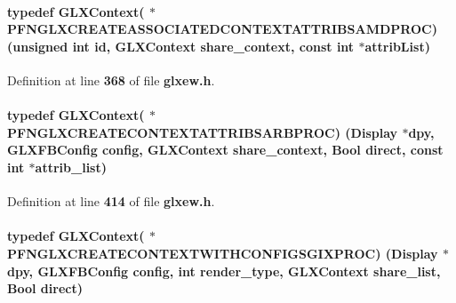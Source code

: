 \paragraph[{P\+F\+N\+G\+L\+X\+C\+R\+E\+A\+T\+E\+A\+S\+S\+O\+C\+I\+A\+T\+E\+D\+C\+O\+N\+T\+E\+X\+T\+A\+T\+T\+R\+I\+B\+S\+A\+M\+D\+P\+R\+OC}]{\setlength{\rightskip}{0pt plus 5cm}typedef {\bf G\+L\+X\+Context}( $\ast$  P\+F\+N\+G\+L\+X\+C\+R\+E\+A\+T\+E\+A\+S\+S\+O\+C\+I\+A\+T\+E\+D\+C\+O\+N\+T\+E\+X\+T\+A\+T\+T\+R\+I\+B\+S\+A\+M\+D\+P\+R\+OC) (unsigned {\bf int} {\bf id}, {\bf G\+L\+X\+Context} share\+\_\+context, const {\bf int} $\ast${\bf attrib\+List})}\label{glxew_8h_adb6a2814b4bdf7f06ba79bdc82104894}


Definition at line {\bf 368} of file {\bf glxew.\+h}.

\paragraph[{P\+F\+N\+G\+L\+X\+C\+R\+E\+A\+T\+E\+C\+O\+N\+T\+E\+X\+T\+A\+T\+T\+R\+I\+B\+S\+A\+R\+B\+P\+R\+OC}]{\setlength{\rightskip}{0pt plus 5cm}typedef {\bf G\+L\+X\+Context}( $\ast$  P\+F\+N\+G\+L\+X\+C\+R\+E\+A\+T\+E\+C\+O\+N\+T\+E\+X\+T\+A\+T\+T\+R\+I\+B\+S\+A\+R\+B\+P\+R\+OC) (Display $\ast$dpy, {\bf G\+L\+X\+F\+B\+Config} config, {\bf G\+L\+X\+Context} share\+\_\+context, Bool direct, const {\bf int} $\ast$attrib\+\_\+list)}\label{glxew_8h_a47d464f2f4a0dca78020027ca8e8dc7d}


Definition at line {\bf 414} of file {\bf glxew.\+h}.

\paragraph[{P\+F\+N\+G\+L\+X\+C\+R\+E\+A\+T\+E\+C\+O\+N\+T\+E\+X\+T\+W\+I\+T\+H\+C\+O\+N\+F\+I\+G\+S\+G\+I\+X\+P\+R\+OC}]{\setlength{\rightskip}{0pt plus 5cm}typedef {\bf G\+L\+X\+Context}( $\ast$  P\+F\+N\+G\+L\+X\+C\+R\+E\+A\+T\+E\+C\+O\+N\+T\+E\+X\+T\+W\+I\+T\+H\+C\+O\+N\+F\+I\+G\+S\+G\+I\+X\+P\+R\+OC) (Display $\ast$dpy, {\bf G\+L\+X\+F\+B\+Config} config, {\bf int} render\+\_\+type, {\bf G\+L\+X\+Context} share\+\_\+list, Bool direct)}\label{glxew_8h_aed8ede12fab5d490bb0482e96d097dfd}


